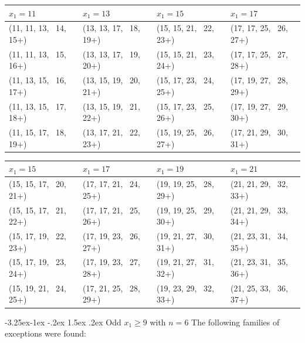 \documentclass[10pt]{article}
\makeatletter
\renewcommand\subsection{\@startsection{subsection}{2}{\z@}
{-3.25ex\@plus -1ex \@minus -.2ex}
{1.5ex \@plus .2ex}
{\normalfont\normalsize\bfseries\boldmath}}
\theoremstyle{definition}
\makeatother
\begin{document}
\bigskip 

\begin{center}
\footnotesize
\begin{tabular}{|l|l|l|l|}
\hline
$x_1 = 11$ & $x_1 = 13$ & $x_1 = 15$ & $x_1 = 17$\\
\hline
(11, 11, 13, \, 14, 15+) & (13, 13, 17, \, 18, 19+) & (15, 15, 21, \, 22, 23+)  & (17, 17, 25, \, 26, 27+) \\
(11, 11, 13, \, 15, 16+) & (13, 13, 17, \, 19, 20+) & (15, 15, 21, \, 23, 24+)  & (17, 17, 25, \, 27, 28+) \\
(11, 13, 15, \, 16, 17+) & (13, 15, 19, \, 20, 21+)  & (15, 17, 23, \, 24, 25+)& (17, 19, 27, \, 28, 29+)\\
(11, 13, 15, \, 17, 18+) & (13, 15, 19, \, 21, 22+) & (15, 17, 23, \, 25, 26+)& (17, 19, 27, \, 29, 30+) \\
(11, 15, 17, \, 18, 19+) & (13, 17, 21, \, 22, 23+)& (15, 19, 25, \, 26, 27+)  & (17, 21, 29, \, 30, 31+)\\
\hline
\end{tabular}
\end{center}

\bigskip 

\begin{center}
\footnotesize
\begin{tabular}{|l|l|l|l|}
\hline
$x_1 = 15$ & $x_1 = 17$ & $x_1 = 19$ & $x_1 = 21$\\
\hline
(15, 15, 17, \, 20, 21+)&(17, 17, 21, \,  24, 25+) &(19, 19, 25, \, 28, 29+) &(21, 21, 29, \, 32, 33+)\\
(15, 15, 17, \, 21, 22+)&(17, 17, 21, \,  25, 26+) &(19, 19, 25, \, 29, 30+) &(21, 21, 29, \, 33, 34+)\\
(15, 17, 19, \, 22, 23+)&(17, 19, 23, \,  26, 27+) &(19, 21, 27, \, 30, 31+) &(21, 23, 31, \, 34, 35+) \\
(15, 17, 19, \, 23, 24+)&(17, 19, 23, \,  27, 28+) &(19, 21, 27, \, 31, 32+) &(21, 23, 31, \, 35, 36+) \\
(15, 19, 21, \, 24, 25+)&(17, 21, 25, \,  28, 29+) &(19, 23, 29, \, 32, 33+) &(21, 25, 33, \, 36, 37+)\\
\hline
\end{tabular}
\end{center}


\subsection{Odd $x_1 \geq 9$ with $n=6$}
\label{ss14-6}
The following families of exceptions were found: 
\end{document}
